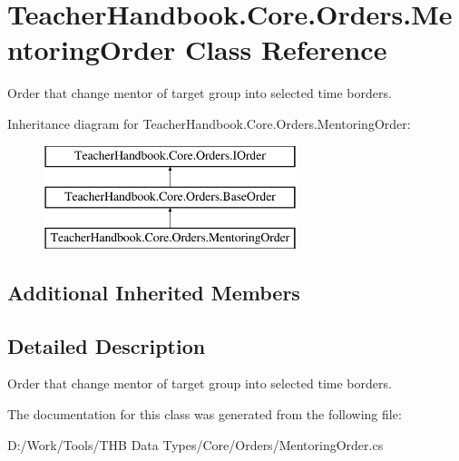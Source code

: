 \hypertarget{class_teacher_handbook_1_1_core_1_1_orders_1_1_mentoring_order}{}\section{Teacher\+Handbook.\+Core.\+Orders.\+Mentoring\+Order Class Reference}
\label{class_teacher_handbook_1_1_core_1_1_orders_1_1_mentoring_order}


Order that change mentor of target group into selected time borders.  


Inheritance diagram for Teacher\+Handbook.\+Core.\+Orders.\+Mentoring\+Order\+:\begin{figure}[H]
\begin{center}
\leavevmode
\includegraphics[height=3.000000cm]{d8/d91/class_teacher_handbook_1_1_core_1_1_orders_1_1_mentoring_order}
\end{center}
\end{figure}
\subsection*{Additional Inherited Members}


\subsection{Detailed Description}
Order that change mentor of target group into selected time borders. 



The documentation for this class was generated from the following file\+:\begin{DoxyCompactItemize}
\item 
D\+:/\+Work/\+Tools/\+T\+H\+B Data Types/\+Core/\+Orders/Mentoring\+Order.\+cs\end{DoxyCompactItemize}
